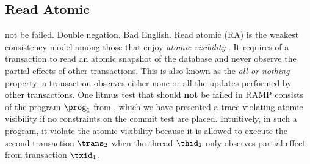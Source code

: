 \subsection{Read Atomic} 
\ac{not be failed. Double negation. Bad English.}
Read atomic (RA) \cite{ramp} is the weakest consistency model among those that enjoy \emph{atomic visibility} \cite{framework-concur}. 
It requires of a transaction to read an atomic snapshot of the database and never observe the partial effects of other transactions.
This is also known as the \emph{all-or-nothing} property: a transaction observes either none or all the updates performed by other transactions. 
One litmus test that should \textbf{not} be failed in RAMP consists of the program $\prog_1$ from , which we have presented a trace violating atomic visibility if no constraints on the commit test are placed.
Intuitively, in such a program, it violate the atomic visibility because it is allowed to execute the second transaction \( \trans_2\) when the thread $\thid_2$ only observes partial effect from transaction \( \txid_1 \).


